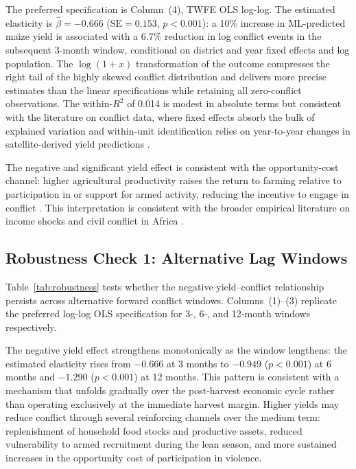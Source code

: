 The preferred specification is Column~(4), TWFE OLS log-log. The estimated elasticity is $\hat{\beta} = -0.666$ ($\text{SE} = 0.153$, $p < 0.001$): a 10\% increase in ML-predicted maize yield is associated with a 6.7\% reduction in log conflict events in the subsequent 3-month window, conditional on district and year fixed effects and log population. The $\log(1+x)$ transformation of the outcome compresses the right tail of the highly skewed conflict distribution and delivers more precise estimates than the linear specifications while retaining all zero-conflict observations. The within-$R^2$ of 0.014 is modest in absolute terms but consistent with the literature on conflict data, where fixed effects absorb the bulk of explained variation and within-unit identification relies on year-to-year changes in satellite-derived yield predictions \citep{HarariLaFerrara2018}.

The negative and significant yield effect is consistent with the opportunity-cost channel: higher agricultural productivity raises the return to farming relative to participation in or support for armed activity, reducing the incentive to engage in conflict \citep{DalBoDalBo2011}. This interpretation is consistent with the broader empirical literature on income shocks and civil conflict in Africa \citep{MiguelSatyanathSergenti2004, BlattmanMiguel2010}.

\subsection{Robustness Check 1: Alternative Lag Windows}

Table~\ref{tab:robustness} tests whether the negative yield--conflict relationship persists across alternative forward conflict windows. Columns~(1)--(3) replicate the preferred log-log OLS specification for 3-, 6-, and 12-month windows respectively.

\begin{table}[H]
\centering
\caption{Robustness Checks: Alternative Windows and Outcome Definitions}
\label{tab:robustness}
\begin{threeparttable}

\end{threeparttable}
\end{table}

The negative yield effect strengthens monotonically as the window lengthens: the estimated elasticity rises from $-0.666$ at 3 months to $-0.949$ ($p < 0.001$) at 6 months and $-1.290$ ($p < 0.001$) at 12 months. This pattern is consistent with a mechanism that unfolds gradually over the post-harvest economic cycle rather than operating exclusively at the immediate harvest margin. Higher yields may reduce conflict through several reinforcing channels over the medium term: replenishment of household food stocks and productive assets, reduced vulnerability to armed recruitment during the lean season, and more sustained increases in the opportunity cost of participation in violence.

